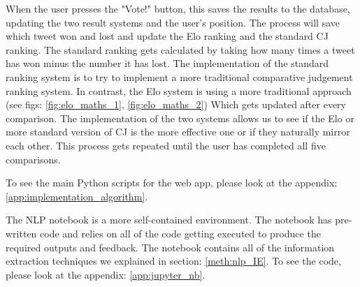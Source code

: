 	When the user presses the "Vote!" button, this saves the results to the database, updating the two result systems and the user's position. The process will save which tweet won and lost and update the Elo ranking and the standard CJ ranking. The standard ranking gets calculated by taking how many times a tweet has won minus the number it has lost. The implementation of the standard ranking system is to try to implement a more traditional comparative judgement ranking system. In contrast, the Elo system is using a more traditional approach (see figs: \ref{fig:elo_maths_1}, \ref{fig:elo_maths_2}) Which gets updated after every comparison. The implementation of the two systems allows us to see if the Elo or more standard version of CJ is the more effective one or if they naturally mirror each other. This process gets repeated until the user has completed all five comparisons.
	
	To see the main Python scripts for the web app, please look at the appendix: \ref{app:implementation_algorithm}.
	
	The NLP notebook is a more self-contained environment. The notebook has pre-written code and relies on all of the code getting executed to produce the required outputs and feedback. The notebook contains all of the information extraction techniques we explained in section: \ref{meth:nlp_IE}. To see the code, please look at the appendix: \ref{app:jupyter_nb}.
	
		
	
	
	
	
	